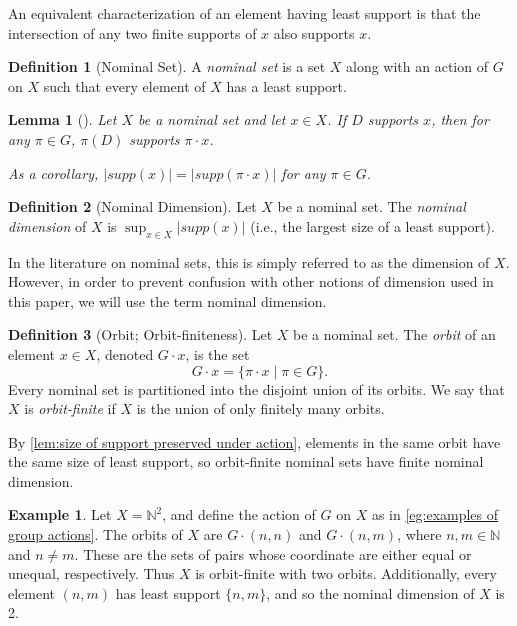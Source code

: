 \documentclass[11pt,a4paper]{amsart}
\newtheorem{lemma}{Lemma}
\theoremstyle{definition}
\newtheorem{definition}{Definition}
\newtheorem{example}{Example}
\newcommand{\bb}{\mathbb}
\begin{document}
An equivalent characterization of an element having least support is that the intersection of any two finite supports of $x$ also supports $x$.

\begin{definition}[Nominal Set]
    A \emph{nominal set} is a set $X$ along with an action of $G$ on $X$ such that every element of $X$ has a least support.
\end{definition}

\begin{lemma}[{\cite[Lemma 4.9]{bojanczyk-klin-lasota:automata-theory-in-nominal-sets}}] \label{lem:size of support preserved under action}
    Let $X$ be a nominal set and let $x \in X$.
    If $D$ supports $x$, then for any $\pi \in G$, $\pi(D)$ supports $\pi \cdot x$.

    As a corollary, $|supp(x)| = |supp(\pi \cdot x)|$ for any $\pi \in G$.
\end{lemma}

\begin{definition}[Nominal Dimension]
    Let $X$ be a nominal set. 
    The \emph{nominal dimension} of $X$ is $\displaystyle \sup_{x \in X} |supp(x)|$ (i.e., the largest size of a least support).
\end{definition}


In the literature on nominal sets, this is simply referred to as the dimension of $X$. 
However, in order to prevent confusion with other notions of dimension used in this paper, we will use the term nominal dimension.

\begin{definition}[Orbit; Orbit-finiteness]
    Let $X$ be a nominal set.
    The \emph{orbit} of an element $x \in X$, denoted $G \cdot x$, is the set
    \[
    G \cdot x = \{\pi \cdot x \mid \pi \in G\}.
    \]
    Every nominal set is partitioned into the disjoint union of its orbits.
    We say that $X$ is \emph{orbit-finite} if $X$ is the union of only finitely many orbits. 
\end{definition}

By \autoref{lem:size of support preserved under action}, elements in the same orbit have the same size of least support, so orbit-finite nominal sets have finite nominal dimension.

\begin{example}
    Let $X = \bb N^2$, and define the action of $G$ on $X$ as in \autoref{eg:examples of group actions}.
    The orbits of $X$ are $G \cdot (n,n)$ and $G \cdot (n,m)$, where $n,m \in \bb N$ and $n \neq m$.
    These are the sets of pairs whose coordinate are either equal or unequal, respectively.
    Thus $X$ is orbit-finite with two orbits.
    Additionally, every element $(n,m)$ has least support $\{n,m\}$, and so the nominal dimension of $X$ is 2.
\end{example}
\end{document}
